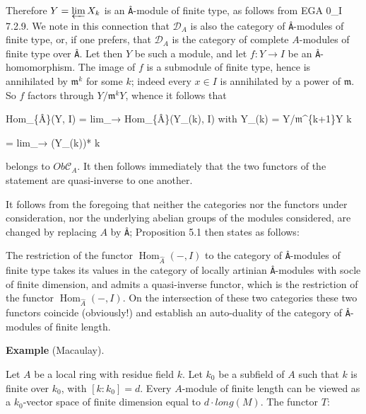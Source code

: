 \documentclass[
]{article}
\newenvironment{Shaded}{}{}
\newcommand{\NormalTok}[1]{#1}
\begin{document}
Therefore \(Y = \varprojlim X_{k}\) is an \texttt{Â}-module of finite
type, as follows from EGA 0\_I 7.2.9. We note in this connection that
\(\mathcal{D}_{A}\) is also the category of \texttt{Â}-modules of finite
type, or, if one prefers, that \(\mathcal{D}_{A}\) is the category of
complete \(A\)-modules of finite type over \texttt{Â}. Let then \(Y\) be
such a module, and let \(f : Y \to I\) be an \texttt{Â}-homomorphism.
The image of \(f\) is a submodule of finite type, hence is annihilated
by \(\mathfrak{m}^{k}\) for some \(k\); indeed every \(x \in I\) is
annihilated by a power of \(\mathfrak{m}\). So \(f\) factors through
\(Y/\mathfrak{m}^{k} Y\), whence it follows that

\begin{Shaded}
\begin{Highlighting}[]
\NormalTok{Hom\_\{Â\}(Y, I) = lim\_→ Hom\_\{Â\}(Y\_(k), I)    with Y\_(k) = Y/𝔪\^{}\{k+1\}Y}
\NormalTok{                  k}

\NormalTok{              = lim\_→ (Y\_(k))*}
\NormalTok{                  k}
\end{Highlighting}
\end{Shaded}

belongs to \(Ob \mathcal{C}_{A}\). It then follows immediately that the
two functors of the statement are quasi-inverse to one another.

It follows from the foregoing that neither the categories nor the
functors under consideration, nor the underlying abelian groups of the
modules considered, are changed by replacing \(A\) by \texttt{Â};
Proposition 5.1 then states as follows:

The restriction of the functor \(\operatorname{Hom}_{\hat{A}}(-, I)\) to
the category of \texttt{Â}-modules of finite type takes its values in
the category of locally artinian \texttt{Â}-modules with socle of finite
dimension, and admits a quasi-inverse functor, which is the restriction
of the functor \(\operatorname{Hom}_{\hat{A}}(-, I)\). On the
intersection of these two categories these two functors coincide
(obviously!) and establish an auto-duality of the category of
\texttt{Â}-modules of finite length.

\textbf{Example} (Macaulay).

Let \(A\) be a local ring with residue field \(k\). Let \(k_{0}\) be a
subfield of \(A\) such that \(k\) is finite over \(k_{0}\), with
\([k : k_{0}] = d\). Every \(A\)-module of finite length can be viewed
as a \(k_{0}\)-vector space of finite dimension equal to
\(d \cdot long(M)\). The functor \(T\):
\end{document}
